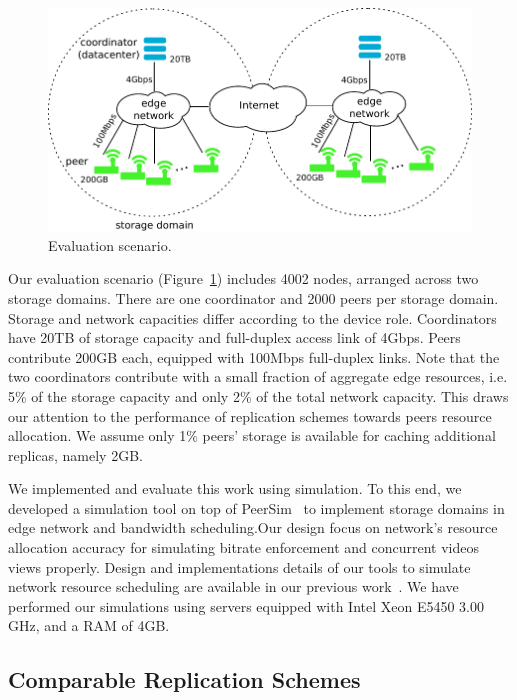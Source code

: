 \begin{figure}
  \centering
     \includegraphics[width=.9\textwidth]{inputs/img/evaluation_scheme}
  \caption{Evaluation scenario.}
  \label{fig:evaluation_scenario}
\end{figure}

Our evaluation scenario (Figure~\ref{fig:evaluation_scenario}) includes 4002 nodes, arranged across two storage domains. There are one coordinator and 2000 peers per storage domain. Storage and network capacities differ according to the device role. Coordinators have 20TB of storage capacity and full-duplex access link of 4Gbps. Peers contribute 200GB each, equipped with 100Mbps full-duplex links. Note that the two coordinators contribute with a small fraction of aggregate edge resources, i.e. 5\% of the storage capacity and only 2\% of the total network capacity. This draws our attention to the performance of replication schemes towards peers resource allocation. We assume only 1\% peers' storage is available for caching additional replicas, namely 2GB.

We implemented and evaluate this work using simulation. To this end, we developed a simulation tool on top of PeerSim~\cite{p2p09-peersim} to implement storage domains in edge network and bandwidth scheduling.Our design focus on network's resource allocation accuracy for simulating bitrate enforcement and concurrent videos views properly.  Design and implementations details of our tools to simulate network resource scheduling are available in our previous work~\cite{silvestre2010most}. We have performed our simulations using servers equipped with Intel Xeon E5450 3.00 GHz, and a RAM of 4GB. 

\subsection{Comparable Replication Schemes}
\label{subsec:methodology_replication_schemes}


